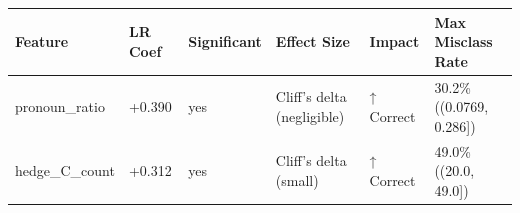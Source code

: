 \begin{tabular}{llllll}
\toprule
Feature & LR Coef & Significant & Effect Size & Impact & Max Misclass Rate \\
\midrule
pronoun\_ratio & +0.390 & yes & Cliff's delta (negligible) & ↑ Correct & 30.2\% ((0.0769, 0.286]) \\
hedge\_C\_count & +0.312 & yes & Cliff's delta (small) & ↑ Correct & 49.0\% ((20.0, 49.0]) \\
\bottomrule
\end{tabular}
